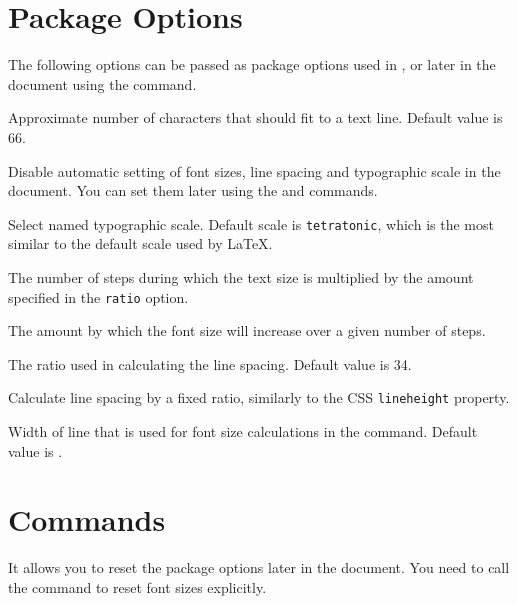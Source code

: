 \documentclass{ltxdoc}
\newcommand\StartDescribe[1]{%
  \par\medskip\noindent\DescribeMacro#1
}
\begin{document}
\section{Package Options}

The following options can be passed as package options used in \cmd{\usepackage}, 
or later in the document using the \cmd{\ResponsiveSetup} command.

\medskip

\noindent {} Approximate number of characters that should fit to a text line. Default value is 66.

\noindent {}  Disable automatic setting of font sizes, line spacing and typographic scale in the document. You can set them 
later using the \cmd{\setsizes} and \cmd{\ResponsiveSetup} commands.

\noindent {} Select named typographic scale. Default scale is
\texttt{tetratonic}, which is the most similar to the default scale used by
\LaTeX.

\noindent {} The number of steps during which the text size is multiplied by the amount specified in the \texttt{ratio} option.

\noindent {} The amount by which the font size will increase over a given number of steps.

\noindent {} The ratio used in calculating the line spacing. Default value is 34.

\noindent {} Calculate line spacing by a fixed ratio, similarly to the CSS \texttt{lineheight} property.

\noindent {} Width of line that is used for font size calculations in the \cmd{\setsizes} command. Default value is \cmd{\textwidth}.




\section{Commands}

\StartDescribe\ResponsiveSetup
\cmd\ResponsiveSetup{}

\noindent It allows you to reset the package options later in the document. You
need to call the \cmd{\setsizes} command to reset font sizes explicitly.

\StartDescribe\setsizes
\cmd\setsizes{}
\end{document}

